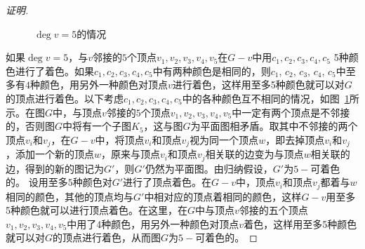 \documentclass{article}
\begin{document}
\begin{CJK*}{UTF8}{gbsn}
\begin{proof}[证明]
\begin{figure}
\begin{minipage}{0.49\linewidth}
  \caption{$\deg v = 5$的情况}
  \label{fig:collision}
  \end{minipage}
\end{figure}    


如果$\deg v = 5$，与$v$邻接的$5$个顶点$v_1,v_2,v_3,v_4,v_5$在$G-v$中用$c_1,c_2,c_3,c_4,c_5$ 5种颜色进行了着色。如果$c_1,c_2,c_3,c_4,c_5$中有两种颜色是相同的，则$c_1$, $c_2$, $c_3$, $c_4$, $c_5$中至多有$4$种颜色，用另外一种颜色对顶点$v$进行着色，这样用至多5种颜色就可以对$G$的顶点进行着色。以下考虑$c_1,c_2,c_3,c_4,c_5$中的各种颜色互不相同的情况，如图~\ref{fig:collision}所示。在图$G$中，与顶点$v$邻接的$5$个顶点$v_1,v_2,v_3,v_4,v_5$中一定有两个顶点是不邻接的，否则图$G$中将有一个子图$K_5$，这与图$G$为平面图相矛盾。取其中不邻接的两个顶点$v_i$和$v_j$，在$G-v$中，将顶点$v_i$和顶点$v_j$视为同一个顶点$w$，即去掉顶点$v_i$和$v_j$，添加一个新的顶点$w$，原来与顶点$v_i$和顶点$v_j$相关联的边变为与顶点$w$相关联的边，得到的新的图记为$G'$，则$G'$仍然为平面图。由归纳假设，$G'$为$5-$可着色的。 设用至多$5$种颜色对$G'$进行了顶点着色。在$G-v$中，顶点$v_i$和顶点$v_j$都着与$w$相同的颜色，其他的顶点均与$G'$中相对应的顶点着相同的颜色，这样$G-v$用至多5种颜色就可以进行顶点着色。在这里，在$G$中与顶点$v$邻接的五个顶点$v_1,v_2,v_3,v_4,v_5$中用了4种颜色，用另外一种颜色对顶点$v$着色，这样用至多5种颜色就可以对$G$的顶点进行着色，从而图$G$为$5-$可着色的。
\end{proof}


\end{CJK*}
\end{document}

